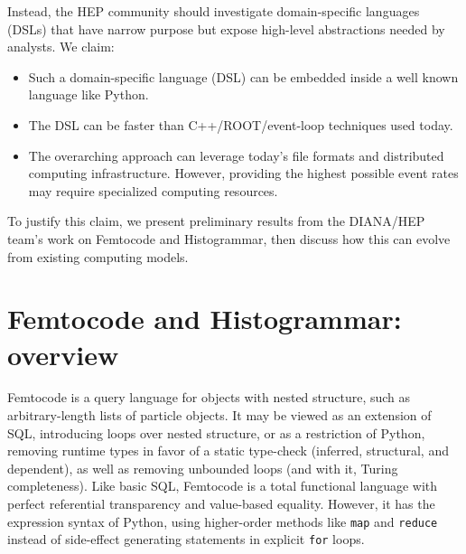 \documentclass{article}
\begin{document}
Instead, the HEP community should investigate domain-specific languages (DSLs) that have narrow purpose but expose high-level abstractions needed by analysts\footnotemark. We claim:


\begin{itemize}
\item Such a domain-specific language (DSL) can be embedded inside a well known language like Python.
\item The DSL can be faster than C++/ROOT/event-loop techniques used today.
\item The overarching approach can leverage today's file formats and distributed computing infrastructure. However, providing the highest possible event rates may require specialized computing resources.
\end{itemize}

To justify this claim, we present preliminary results from the DIANA/HEP team's work on Femtocode and Histogrammar, then discuss how this can evolve from existing computing models.

\section{Femtocode and Histogrammar: overview}

Femtocode is a query language for objects with nested structure, such as arbitrary-length lists of particle objects. It may be viewed as an extension of SQL, introducing loops over nested structure, or as a restriction of Python, removing runtime types in favor of a static type-check (inferred, structural, and dependent), as well as removing unbounded loops (and with it, Turing completeness). Like basic SQL, Femtocode is a total functional language \footnotemark  with perfect referential transparency and value-based equality. However, it has the expression syntax of Python, using higher-order methods like {\tt map} and {\tt reduce} instead of side-effect generating statements in explicit {\tt for} loops.

\end{document}
